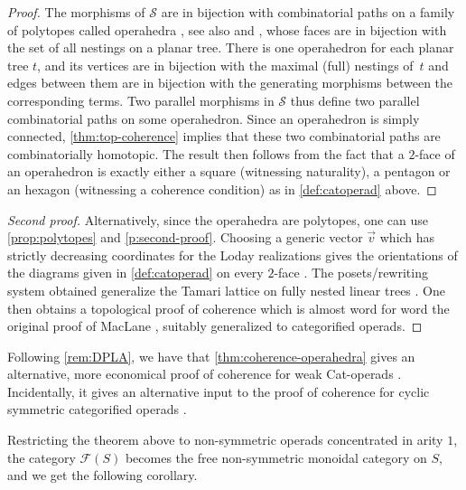 \begin{proof}
The morphisms of $\mathcal{S}$ are in bijection with combinatorial paths on a family of polytopes called operahedra \cite[Sec.~2.1]{laplante-anfossiDiagonalOperahedra2022a}, see also \cite[Sec.~13]{DP15} and \cite{curienSyntacticAspectsHypergraph2019a}, whose faces are in bijection with the set of all nestings on a planar tree. 
There is one operahedron for each planar tree $t$, and its vertices are in bijection with the maximal (full) nestings of~$t$ and edges between them are in bijection with the generating morphisms between the corresponding terms. 
Two parallel morphisms in $\mathcal{S}$ thus define two parallel combinatorial paths on some operahedron. 
Since an operahedron is simply connected, \cref{thm:top-coherence} implies that these two combinatorial paths are combinatorially homotopic. 
The result then follows from the fact that a $2$-face of an operahedron is exactly either a square (witnessing naturality), a pentagon or an hexagon (witnessing a coherence condition) as in \cref{def:catoperad} above.
\end{proof}

\begin{proof}[Second proof]
    Alternatively, since the operahedra are polytopes, one can use \cref{prop:polytopes} and \cref{p:second-proof}. 
    Choosing a generic vector $\vec v$ which has strictly decreasing coordinates for the Loday realizations \cite[Section 2.2]{laplante-anfossiDiagonalOperahedra2022a} gives the orientations of the diagrams given in \cref{def:catoperad} on every $2$-face \cite[Proposition 3.11]{laplante-anfossiDiagonalOperahedra2022a}.
    The posets/rewriting system obtained generalize the Tamari lattice on fully nested linear trees \cite[Definition 2.8]{laplante-anfossiDiagonalOperahedra2022a}.
    One then obtains a topological proof of coherence which is almost word for word the original proof of MacLane \cite[Theorem 3.1]{MacLane63}, suitably generalized to categorified operads. 
\end{proof}
   
Following \cref{rem:DPLA}, we have that \cref{thm:coherence-operahedra} gives an alternative, more economical proof of coherence for weak Cat-operads \cite[Proposition 14.2]{DP15}.
Incidentally, it gives an alternative input to the proof of coherence for cyclic symmetric categorified operads \cite{curienCategorifiedCyclicOperads2020}.

Restricting the theorem above to non-symmetric operads concentrated in arity $1$, the category $\mathcal{F}(S)$ becomes the free non-symmetric monoidal category on $S$, and we get the following corollary. 

